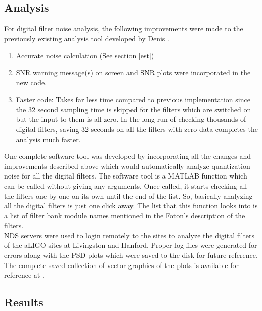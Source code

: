 \documentclass[colorlinks=true,pdfstartview=FitV,linkcolor=blue,
            citecolor=red,urlcolor=magenta]{ligodoc}
\begin{document}
	\subsection{Analysis}
	For digital filter noise analysis, the following improvements were made to the previously existing analysis tool developed by Denis \cite{Martynov}.
	\begin{enumerate}
		\item Accurate noise calculation (See section \ref{est})
		\item SNR warning message(s) on screen and SNR plots were incorporated in the new code.
		\item Faster code: Takes far less time compared to previous implementation since the 32 second sampling time is skipped for the filters which are switched on but the input to them is all zero. In the long run of checking thousands of digital filters, saving 32 seconds on all the filters with zero data completes the analysis much faster.
	\end{enumerate}

	One complete software tool was developed by incorporating all the changes and improvements described above which would automatically analyze quantization noise for all the digital filters. The software tool is a MATLAB function which can be called without giving any arguments. Once called, it starts checking all the filters one by one on its own until the end of the list. So, basically analyzing all the digital filters is just one click away. The list that this function looks into is a list of filter bank module names mentioned in the Foton's description of the filters. \\
	NDS servers were used to login remotely to the sites to analyze the digital filters of the aLIGO sites at Livingston and Hanford. Proper log files were generated for errors along with the PSD plots which were saved to the disk for future reference. The complete saved collection of vector graphics of the plots is available for reference at \cite{Collection}.  \\
	
	\subsection{Results}
\end{document}
